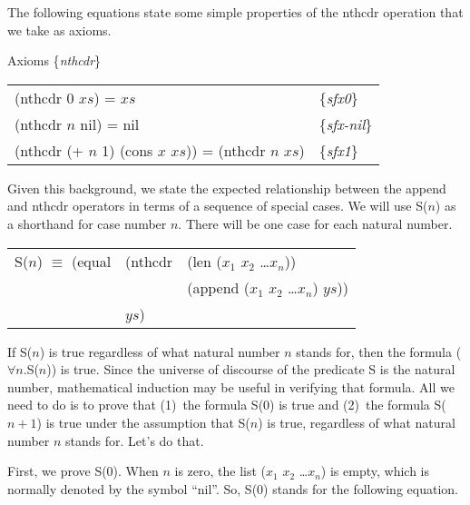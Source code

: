 The following equations state some simple properties of the nthcdr operation that we take as axioms.

\label{nthcdr-equations}
\begin{center}
Axioms \{\emph{nthcdr}\} \\
\begin{tabular}{ll}
(nthcdr 0 $xs$) = $xs$                                 & \{\emph{sfx0}\}     \\
(nthcdr $n$ nil) =  nil                                & \{\emph{sfx-nil}\}  \\
(nthcdr (+ $n$ 1) (cons $x$ $xs$)) = (nthcdr $n$ $xs$) & \{\emph{sfx1}\}     \\
\end{tabular}
\end{center}



Given this background, we state the expected relationship 
between the append and nthcdr operators in terms of a sequence of special cases.
 We will use S($n$) as a shorthand for case number $n$. 
 There will be one case for each natural number.

\begin{center}
\begin{tabular}{lll}
S($n$) $\equiv$ (equal & (nthcdr & (len ($x_1$ $x_2$ \dots $x_n$))          \\
                       &         & (append ($x_1$ $x_2$ \dots $x_n$) $ys$)) \\
                       & $ys$)   &                                          \\
\end{tabular}
\end{center}

If S($n$) is true regardless of what natural number $n$ stands for, 
then the formula ($\forall$$n$.S($n$)) is true. 
Since the universe of discourse of the predicate S is the natural number,
mathematical induction may be useful in verifying that formula. 
All we need to do is to prove that 
(1)~the formula S(0) is true and 
(2)~the formula S($n+1$) is true under the assumption that S($n$) is true, 
regardless of what natural number $n$ stands for. Let's do that.

First, we prove S(0). 
When $n$ is zero, the list ($x_1$ $x_2$ \dots $x_n$) is empty, 
which is normally denoted by the symbol ``nil''. 
So, S(0) stands for the following equation.

